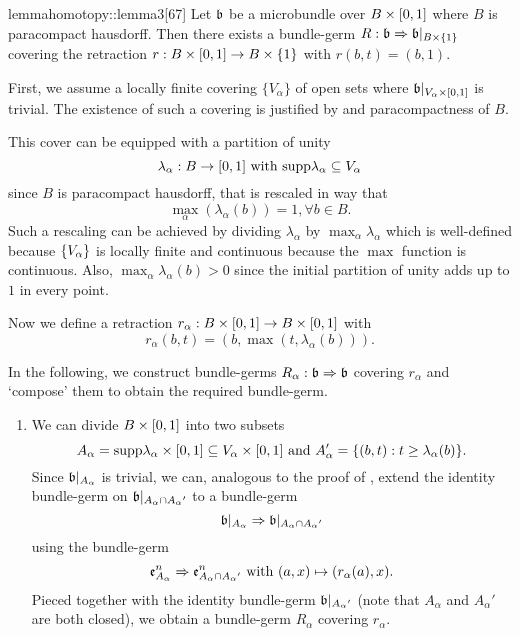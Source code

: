 \begin{scope}
    \newcommand{\A} {
        A_\alpha{}
    }

    \begin{mystatement}{lemma}{homotopy::lemma3}[67]
        Let $\bb$ be a microbundle over $B \times{} [0, 1]$ where $B$ is paracompact hausdorff.
        Then there exists a bundle-germ $\germdef{R}{\bb}{\bb[\cylup{B}]}$
        covering the retraction $r: B \times{} [0, 1] \to B \times{} \{1\}$ with $r(b, t) = (b, 1)$.
    \end{mystatement}

    \begin{myproof}
        First, we assume a locally finite covering $\{V_\alpha\}$ of open sets
        where $\bb[\cyl{V_\alpha}]$ is trivial.
        The existence of such a covering is justified
        by  and paracompactness of $B$.

        This cover can be equipped with a partition of unity 
        \[ \lambda_\alpha: B \to [0, 1] \text{ with } \text{supp} \lambda_\alpha \subseteq{} V_\alpha \]
        since $B$ is paracompact hausdorff, that is rescaled in way that
        \[ \max_\alpha(\lambda_\alpha(b)) = 1, \forall b \in B. \]
        Such a rescaling can be achieved by dividing $\lambda_\alpha$ by $\max_\alpha \lambda_\alpha$
        which is well-defined because $\{V_\alpha\}$ is locally finite and continuous
        because the $\max$ function is continuous.
        Also, $\max_\alpha \lambda_\alpha(b) > 0$ since the initial
        partition of unity adds up to $1$ in every point.

        Now we define a retraction $r_\alpha: B \times{} [0, 1] \to B \times{} [0, 1]$ with
        \[ r_\alpha(b, t) = (b, \max(t, \lambda_\alpha(b))). \]

        In the following,
        we construct bundle-germs $\germdef{R_\alpha}{\bb}{\bb}$
        covering $r_\alpha$ and `compose' them to obtain the required bundle-germ.
        \begin{enumerate}
            \item 
            We can divide $B \times [0, 1]$ into two subsets
            \[
                A_\alpha = \text{supp}{\lambda_\alpha} \times{} [0, 1] \subseteq{} V_\alpha \times{} [0, 1] \text{ and }
                A'_\alpha = \{(b, t):t \ge \lambda_\alpha(b)\}.
            \]
            Since $\bb[A_\alpha]$ is trivial, we can,
            analogous to the proof of ,
            extend the identity bundle-germ on $\bb[\A \cap \A']$ to a bundle-germ
            \[ \germ{\bb[\A]}{\bb[\A \cap \A']} \]
            using the bundle-germ
            \[ \germ{\be{\A}}{\be{\A \cap \A'}} \twith (a, x) \mapsto (r_\alpha(a), x). \]
            Pieced together with the identity bundle-germ $\bb[\A']$
            (note that $\A$ and $\A'$ are both closed),
            we obtain a bundle-germ $R_\alpha$ covering $r_\alpha$.
            

\end{enumerate}
\end{myproof}
\end{scope}
